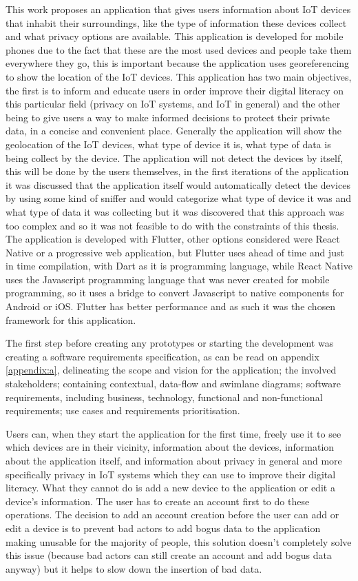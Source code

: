This work proposes an application that gives users information about IoT
devices that inhabit their surroundings, like the type of information these devices
collect and what privacy options are available. This application is developed
for mobile phones due to the fact that these are the most used devices
and people take them everywhere they go, this is important because the application
uses georeferencing to show the location of the IoT devices. This application
has two main objectives, the first is to inform and educate users in order improve
their digital literacy on this particular field (privacy on IoT systems, and
IoT in general) and the other being to give users a way to make informed decisions
to protect their private data, in a concise and convenient place. Generally
the application will show the geolocation of the IoT devices, what type of
device it is, what type of data is being collect by the device. The application
will not detect the devices by itself, this will be done by the users themselves,
in the first iterations of the application it was discussed that the application
itself would automatically detect the devices by using some kind of sniffer
and would categorize what type of device it was and what type of data it
was collecting but it was discovered that this approach was too complex and
so it was not feasible to do with the constraints of this thesis. The application
is developed with Flutter, other options considered were React Native or a
progressive web application, but Flutter uses ahead of time and just in time
compilation, with Dart as it is programming language, while React Native uses
the Javascript programming language that was never created for mobile programming,
so it uses a bridge to convert Javascript to native components for Android
or iOS. Flutter has better performance and as such it was the chosen framework
for this application.

The first step before creating any prototypes or starting the development was
creating a software requirements specification, as can be read on appendix \ref{appendix:a},
delineating the scope and vision for the application; the involved stakeholders;
containing contextual, data-flow and swimlane diagrams; software requirements, including
business, technology, functional and non-functional requirements; use cases
and requirements prioritisation.

Users can, when they start the application for the first time, freely use it to see
which devices are in their vicinity,
information about the devices, information about the application itself, and
information about privacy in general and more specifically privacy in IoT systems
which they can use to improve their digital literacy. What they cannot do is
add a new device to the application or edit a device's information. The user has
to create an account first to do these operations. The decision to add an
account creation before the user can add or edit a device is to prevent
bad actors to add bogus data to the application making unusable for the majority
of people, this solution doesn't completely solve this issue (because bad actors
can still create an account and add bogus data anyway) but it helps to slow
down the insertion of bad data.

